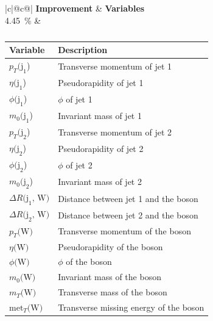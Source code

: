 \begin{table}[h]
    \centering
    \label{tab:app_vars_5}
    \caption{}
    \begin{tabular}{ |c|@{}c@{}| }
        \hline
        \textbf{Improvement} & \textbf{Variables}\\
        \hline
        \SI{4.45}{\%} & 
        \begin{tabular}{ll}
            \hline
            Variable & Description\\
            \hline
            $p_T\text{(j}_\text{1}$) & Transverse momentum of jet 1\\
            $\eta\text{(j}_\text{1}$) & Pseudorapidity of jet 1\\
            $\phi\text{(j}_\text{1}$) & $\phi$ of jet 1\\
            $m_0\text{(j}_\text{1}$) & Invariant mass of jet 1\\

            $p_T\text{(j}_\text{2}$) & Transverse momentum of jet 2\\
            $\eta\text{(j}_\text{2}$) & Pseudorapidity of jet 2\\
            $\phi\text{(j}_\text{2}$) & $\phi$ of jet 2\\
            $m_0\text{(j}_\text{2}$) & Invariant mass of jet 2\\

            $\Delta R\text{(j}_\text{1}\text{, W)}$ & Distance between jet 1 and the \PW boson\\
            $\Delta R\text{(j}_\text{2}\text{, W)}$ & Distance between jet 2 and the \PW boson\\

            $p_T\text{(W)}$ & Transverse momentum of the \PW boson\\
            $\eta\text{(W)}$ & Pseudorapidity of the \PW boson\\
            $\phi\text{(W)}$ & $\phi$ of the \PW boson\\
            $m_0\text{(W)}$ & Invariant mass of the \PW boson\\
            $m_T\text{(W)}$ & Transverse mass of the \PW boson\\
            $\text{met}_T\text{(W)}$ & Transverse missing energy of the \PW boson\\
            \hline
        \end{tabular}\\
        \hline
    \end{tabular}
\end{table}

